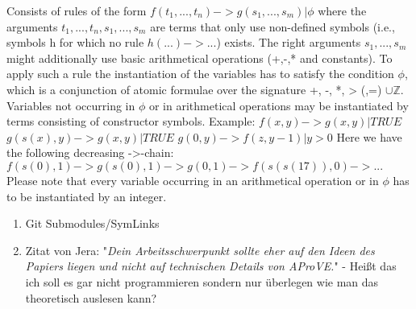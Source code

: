 Consists of rules of the form
$ f(t_1, ..., t_n) -> g(s_1, ..., s_m) | \phi$
where the arguments $t_1, ..., t_n, s_1, ..., s_m$ are terms that only use
non-defined symbols (i.e., symbols h for which no rule $h(...) -> ...$)
exists. The right arguments $s_1, ...,s_m$  might additionally use basic arithmetical
operations (+,-,* and constants).\newline\newline
To apply such a rule the instantiation of the variables has to satisfy the condition $\phi$, which
is a conjunction of atomic formulae over the signature {+, -, *, > (,=)} $\cup \mathbb{Z}$.
Variables not occurring in $\phi$ or in arithmetical operations may be instantiated by terms consisting
of constructor symbols.\newline
\newline
Example:
$ f(x,y) -> g(x,y) | TRUE $ \newline
$ g(s(x),y) -> g(x,y) | TRUE $ \newline
$ g(0,y) -> f(z,y-1) | y > 0$ \newline
\newline
Here we have the following decreasing ->-chain: \newline
$ f(s(0),1) -> g(s(0),1) -> g(0,1) -> f(s(s(17)),0) -> ...$\newline
\newline
Please note that every variable occurring in an arithmetical operation or in $ \phi$ has to be instantiated by an
integer.

\begin{enumerate}
	\item Git Submodules/SymLinks
	\item Zitat von Jera: "\textit{Dein Arbeitsschwerpunkt sollte eher auf den Ideen des Papiers liegen und nicht auf technischen Details von AProVE.}" - Heißt das ich soll es gar nicht programmieren sondern nur überlegen wie man das theoretisch auslesen kann?
\end{enumerate}

